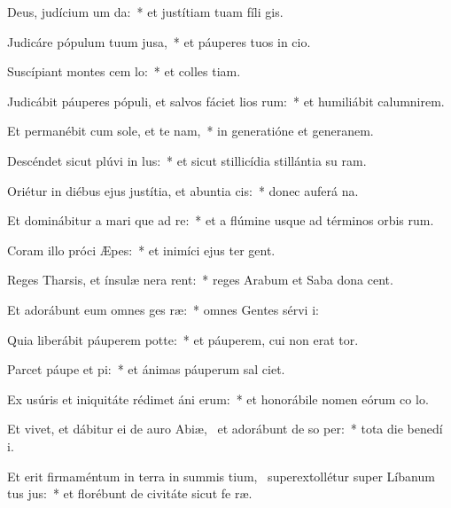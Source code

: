 \item Deus, judícium um  da:~* et justítiam tuam fíli gis.
\item Judicáre pópulum tuum  jusa,~* et páuperes tuos in cio.
\item Suscípiant montes cem lo:~* et colles tiam.
\item Judicábit páuperes pópuli, et salvos fáciet lios rum:~* et humiliábit calumnirem.
\item Et permanébit cum sole, et te nam,~* in generatióne et generanem.
\item Descéndet sicut plúvi in lus:~* et sicut stillicídia stillántia su ram.
\item Oriétur in diébus ejus justítia, et abuntia cis:~* donec auferá na.
\item Et dominábitur a mari que ad re:~* et a flúmine usque ad términos orbis rum.
\item Coram illo próci Æpes:~* et inimíci ejus ter gent.
\item Reges Tharsis, et ínsulæ nera rent:~* reges Arabum et Saba dona cent.
\item Et adorábunt eum omnes ges ræ:~* omnes Gentes sérvi i:
\item Quia liberábit páuperem  potte:~* et páuperem, cui non erat tor.
\item Parcet páupe et pi:~* et ánimas páuperum sal ciet.
\item Ex usúris et iniquitáte rédimet áni erum:~* et honorábile nomen eórum co lo.
\item Et vivet, et dábitur ei de auro Abiæ,~\pscross{} et adorábunt de so per:~* tota die benedí i.
\item Et erit firmaméntum in terra in summis tium,~\pscross{} superextollétur super Líbanum tus jus:~* et florébunt de civitáte sicut fe ræ.
